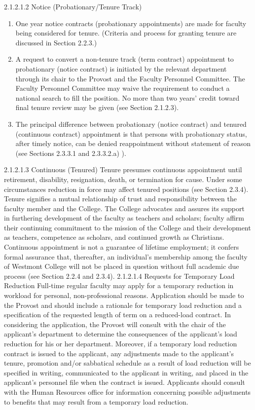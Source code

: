 \documentclass[letterpaper, 11pt]{article}
\begin{document}
				2.1.2.1.2 Notice (Probationary/Tenure Track)
				\begin{enumerate}[label=\alph*)]
					\item{One year notice contracts (probationary appointments) are made for faculty being considered for tenure.  (Criteria and process for granting tenure are discussed in Section 2.2.3.)}
					\item{A request to convert a non-tenure track (term contract) appointment to probationary (notice contract) is initiated by the relevant department through its chair to the Provost and the Faculty Personnel Committee.  The Faculty Personnel Committee may waive the requirement to conduct a national search to fill the position.  No more than two years' credit toward final tenure review may be given (see Section 2.1.2.3).}
					\item{The principal difference between probationary (notice contract) and tenured (continuous contract) appointment is that persons with probationary status, after timely notice, can be denied reappointment without statement of reason (see Sections 2.3.3.1 and 2.3.3.2.a) ).}
				\end{enumerate}
				2.1.2.1.3 Continuous (Tenured)
				Tenure presumes continuous appointment until retirement, disability, resignation, death, or termination for cause.  Under some circumstances reduction in force may affect tenured positions (see Section 2.3.4).  Tenure signifies a mutual relationship of trust and responsibility between the faculty member and the College.  The College advocates and assures its support in furthering development of the faculty as teachers and scholars; faculty affirm their continuing commitment to the mission of the College and their development as teachers, competence as scholars, and continued growth as Christians. Continuous appointment is not a guarantee of lifetime employment; it confers formal assurance that, thereafter, an individual's membership among the faculty of Westmont College will not be placed in question without full academic due process (see Section 2.2.4 and 2.3.4).
				2.1.2.1.4 Requests for Temporary Load Reduction
				Full-time regular faculty may apply for a temporary reduction in workload for personal, non-professional reasons.  Application should be made to the Provost and should include a rationale for temporary load reduction and a specification of the requested length of term on a reduced-load contract.  In considering the application, the Provost will consult with the chair of the applicant's department to determine the consequences of the applicant's load reduction for his or her department.  Moreover, if a temporary load reduction contract is issued to the applicant, any adjustments made to the applicant's tenure, promotion and/or sabbatical schedule as a result of load reduction will be specified in writing, communicated to the applicant in writing, and placed in the applicant's personnel file when the contract is issued.  Applicants should consult with the Human Resources office for information concerning possible adjustments to benefits that may result from a temporary load reduction.
\end{document}
